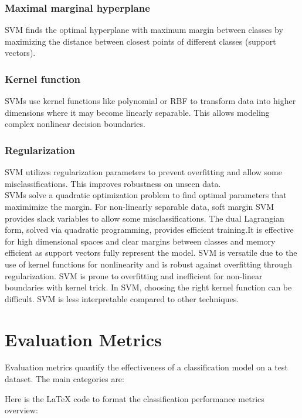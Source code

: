 \documentclass[12pt, a4paper, twoside]{report}
\theoremstyle{plain} %
\theoremstyle{definition} %
\theoremstyle{remark} %
\numberwithin{equation}{chapter}
\begin{document}
\subsubsection{Maximal marginal hyperplane} SVM finds the optimal hyperplane with maximum margin between classes by maximizing the distance between closest points of different classes (support vectors).
\subsubsection{Kernel function} SVMs use kernel functions like polynomial or RBF to transform data into higher dimensions where it may become linearly separable. This allows modeling complex nonlinear decision boundaries.
\subsubsection{Regularization} SVM utilizes regularization parameters to prevent overfitting and allow some misclassifications. This improves robustness on unseen data.\\


SVMs solve a quadratic optimization problem to find optimal parameters that maximimize the margin. For non-linearly separable data, soft margin SVM provides slack variables to allow some misclassifications. The dual Lagrangian form, solved via quadratic programming, provides efficient training.It is effective for high dimensional spaces and clear margins between classes and memory efficient as support vectors fully represent the model. SVM is versatile due to the use of kernel functions for nonlinearity and is robust against overfitting through regularization. SVM is prone to overfitting and inefficient for non-linear boundaries with kernel trick. In SVM, choosing the right kernel function can be difficult. SVM is less interpretable compared to other techniques.


\section{Evaluation Metrics}
Evaluation metrics quantify the effectiveness of a classification model on a test dataset. The main categories are:

Here is the LaTeX code to format the classification performance metrics overview:
\end{document}
